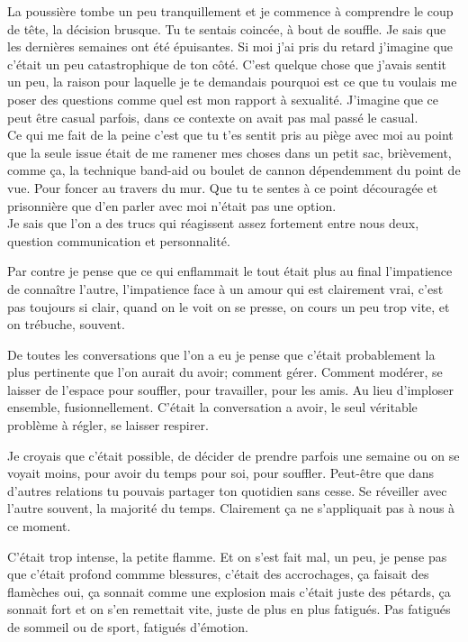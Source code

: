 

La poussière tombe un peu tranquillement et je commence à comprendre le coup de
tête, la décision brusque.  Tu te sentais coincée, à bout de souffle. Je sais
que les dernières semaines ont été épuisantes. Si moi j'ai pris du retard
j'imagine que c'était un peu catastrophique de ton côté.  C'est quelque chose
que j'avais sentit un peu, la raison pour laquelle je te demandais pourquoi est
ce que tu voulais me poser des questions comme quel est mon rapport à
sexualité. J'imagine que ce peut être casual parfois, dans ce contexte on avait
pas mal passé le casual.\\

Ce qui me fait de la peine c'est que tu t'es sentit pris au piège avec moi au
point que la seule issue était de me ramener mes choses dans un petit sac,
brièvement, comme ça, la technique band-aid ou boulet de cannon dépendemment du
point de vue. Pour foncer au travers du mur. Que tu te sentes à ce point
découragée et prisonnière que d'en parler avec moi n'était pas une option.\\

Je sais que l'on a des trucs qui réagissent assez fortement entre nous deux,
question communication et personnalité. 

Par contre je pense que ce qui enflammait le tout était plus au final
l'impatience de connaître l'autre, l'impatience face à un amour qui est
clairement vrai, c'est pas toujours si clair, quand on le voit on se presse, on
cours un peu trop vite, et on trébuche, souvent.

De toutes les conversations que l'on a eu je pense que c'était probablement la
plus pertinente que l'on aurait du avoir; comment gérer. Comment modérer, se
laisser de l'espace pour souffler, pour travailler, pour les amis. Au lieu
d'imploser ensemble, fusionnellement. C'était la conversation a avoir, le seul
véritable problème à régler, se laisser respirer.

Je croyais que c'était possible, de décider de prendre parfois une semaine ou
on se voyait moins, pour avoir du temps pour soi, pour souffler. Peut-être que
dans d'autres relations tu pouvais partager ton quotidien sans cesse. Se
réveiller avec l'autre souvent, la majorité du temps. Clairement ça ne
s'appliquait pas à nous à ce moment.

C'était trop intense, la petite flamme. Et on s'est fait mal, un peu, je pense
pas que c'était profond commme blessures, c'était des accrochages, ça faisait
des flamèches oui, ça sonnait comme une explosion mais c'était juste des
pétards, ça sonnait fort et on s'en remettait vite, juste de plus en plus
fatigués.  Pas fatigués de sommeil ou de sport, fatigués d'émotion.

